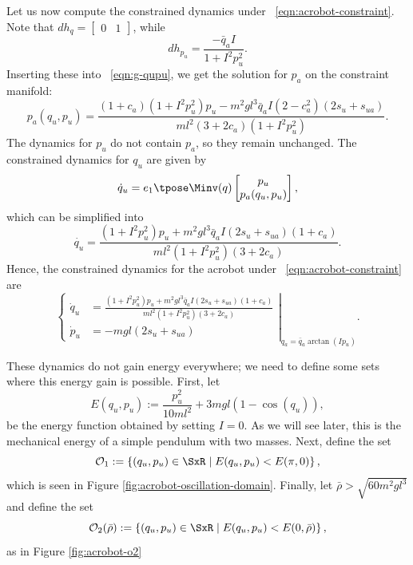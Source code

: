 Let us now compute the constrained dynamics under
~\eqref{eqn:acrobot-constraint}.
Note that \(dh_q = \begin{bmatrix}0 & 1\end{bmatrix}\), while
\[
    dh_{p_u} = \frac{-\bar{q}_a I}{1 + I^2 p_u^2}
    .
\]
Inserting these into ~\eqref{eqn:g-qupu}, we get the solution for \(p_a\) on the
constraint manifold:
\[
    p_a(q_u,p_u) = \frac{
        (1+c_a)(1+I^2 p_u^2)p_u - m^2gl^3\bar{q}_a I (2-c_a^2)(2s_u + s_{ua})
    }{ml^2(3+2c_a)(1+I^2 p_u^2)}
    .
\]
The dynamics for \(p_u\) do not contain \(p_a\), so they remain unchanged.
The constrained dynamics for \(q_u\) are given by 
\begin{equation*}
    \dot{q}_u = e_1\tpose \Minv(q) \begin{bmatrix}
                    p_u \\ p_a(q_u,p_u)
                \end{bmatrix} %
    ,
\end{equation*}
which can be simplified into 
\begin{equation*}
    \dot{q_u} = \frac{(1+I^2 p_u^2)p_u + m^2gl^3\bar{q}_a I(2s_u + s_{ua})(1+c_a) }{ml^2(1+I^2 p_u^2)(3+2c_a)}
    .
\end{equation*}
Hence, the constrained dynamics for the acrobot under
~\eqref{eqn:acrobot-constraint} are
\begin{equation}\label{eqn:acrobot-constrained-dynamics}
\left.\begin{cases}
    \dot{q}_u &= \frac{(1+I^2 p_u^2)p_u + m^2gl^3\bar{q}_a I(2s_u + s_{ua})(1+c_a) }
            {ml^2(1+I^2 p_u^2)(3+2c_a)}
        \\
    \dot{p}_u &= - m g l (2s_u + s_{ua})
    \end{cases} \right|_{q_a = \bar{q}_a\arctan(Ip_u)}
    .
\end{equation}

These dynamics do not gain energy everywhere; we need to define some sets where
this energy gain is possible.
First, let 
\[
    E(q_u,p_u) := \frac{p_u^2}{10ml^2} + 3mgl(1 - \cos(q_u))
    ,
\]
be the energy function obtained by setting \(I = 0\).
As we will see later, this is the mechanical energy of a simple pendulum with
two masses.
Next, define the set
\begin{equation}\label{eqn:oscillation-domain}
    \mathcal{O}_1 := \left\{(q_u,p_u) \in \SxR 
    \mid E(q_u,p_u) < E(\pi,0) \right\}
    ,
\end{equation}
which is seen in Figure \ref{fig:acrobot-oscillation-domain}.
Finally, let \(\bar{\rho} > \sqrt{60m^2gl^3}\) and define the set
\begin{equation}\label{eqn:o-rhobar}
    \mathcal{O}_2(\bar{\rho}) := \left\{(q_u,p_u) \in \SxR
        \mid E(q_u,p_u) < E(0,\bar{\rho}) \right\}
    ,
\end{equation}
as in Figure \ref{fig:acrobot-o2}

